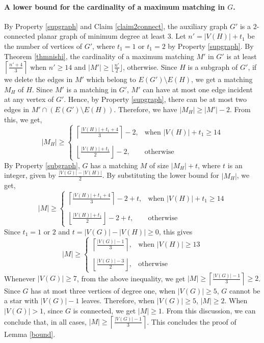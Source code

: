 \paragraph{\textbf{A lower bound for the cardinality of a maximum matching in $G$.}}
By Property \ref{supgraph} and Claim \ref{claim2connect}, the auxiliary graph $G'$ is a $2$-connected planar graph of minimum degree at least $3$. 
Let $n'=|V(H)|+t_1$ be the number of vertices of $G'$, where $t_1=1$ or $t_1=2$ by Property \ref{supgraph}. By Theorem \ref{thmnishi}, the cardinality 
of a maximum matching $M'$ in $G'$ is at least $\left\lceil \frac{n'+4}{3}\right \rceil$ when $n' \ge 14$ and 
$|M'| \ge \lfloor \frac{n'}{2} \rfloor$, otherwise. Since $H$ is a subgraph of $G'$, if we delete the edges in $M'$ which belong to 
$E(G') \setminus E(H)$, we get a matching $M_H$ of $H$. Since $M'$ is a matching in $G'$, $M'$ can have at most one edge incident at any vertex 
of $G'$. Hence, by Property \ref{supgraph}, there can be at most two edges in $M' \cap (E(G') \setminus E(H))$. 
Therefore, we have $|M_H| \ge |M'| - 2$.  
From this, we get, 
$$
|M_H| \ge \left\{ \begin{array}{rl}
 \left\lceil \frac{|V(H)|+t_1+4}{3}\right \rceil - 2, &\mbox{when $|V(H)|+t_1 \ge 14$} \\\\
 \left\lfloor \frac{|V(H)|+t_1}{2} \right\rfloor -2, &\mbox{otherwise}  
       \end{array} \right.
$$
By Property \ref{subgraph}, $G$ has a matching $M$ of size $|M_H| + t$, where $t$ is an integer, given by $\frac{|V(G)|-|V(H)|}{2}$. 
By substituting the lower bound for $|M_H|$, we get,
$$
|M| \ge \left\{ \begin{array}{rl}
 \left\lceil \frac{|V(H)|+t_1+4}{3}\right \rceil - 2 + t, &\mbox{when $|V(H)|+t_1 \ge 14$} \\\\
 \left\lfloor \frac{|V(H)|+t_1}{2} \right\rfloor -2 + t, &\mbox{otherwise}  
       \end{array} \right.
$$
Since $t_1=1$ or $2$ and $t=|V(G)|-|V(H)|\ge 0$, this gives
$$
|M| \ge \left\{ \begin{array}{rl}
 \left\lceil \frac{|V(G)|-1}{3}\right \rceil, &\mbox{when $|V(H)| \ge 13$} \\\\
 \left\lfloor \frac{|V(G)|-3}{2} \right\rfloor, &\mbox{otherwise}  
       \end{array} \right.
$$
Whenever $|V(G)| \ge 7$, from the above inequality, we get $|M| \ge \left\lceil\frac{|V(G)|-1}{3}\right\rceil \ge 2$. Since $G$ has at most 
three vertices of degree one, when $|V(G)| \ge 5$, $G$ cannot be a star with $|V(G)|-1$ leaves. Therefore, when $|V(G)| \ge 5$, $|M| \ge 2$. 
When $|V(G)| >1$, since  $G$ is connected, we get $|M| \ge 1$. From this discussion, we can conclude that, in all cases, 
$|M| \ge \left\lceil\frac{|V(G)|-1}{3}\right\rceil$. This concludes the proof of Lemma \ref{bound}.

